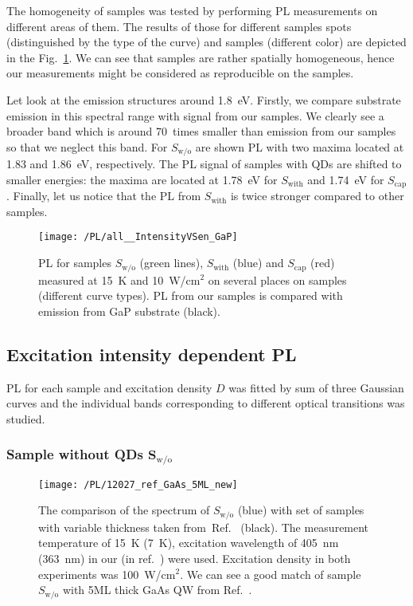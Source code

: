 The homogeneity of samples was tested by performing PL measurements on different areas of them. The results of those for different samples spots (distinguished by the type of the curve) and samples (different color) are depicted in the Fig.~\ref{fig:PL_homogenity}. We can see that samples are rather spatially homogeneous, hence our measurements might be considered as reproducible on the samples. %

Let look at the emission structures around 1.8~eV. Firstly, we compare substrate emission in this spectral range with signal from our samples. We clearly see a broader band which is around 70~times smaller than emission from our samples so that we neglect this band. For $S_\mathrm{w/o}$ are shown PL with two maxima located at 1.83 and 1.86~eV, respectively. The PL signal of samples with QDs are shifted to smaller energies: the maxima are located at 1.78~eV for $S_\mathrm{with}$ and 1.74~eV for $S_\mathrm{cap}$. Finally, let us notice that the PL from $S_\mathrm{with}$ is twice stronger compared to other samples.
\begin{figure}
	\centering
	\texttt{[image: /PL/all\_\_IntensityVSen\_GaP]}
	\caption{PL for samples $S_\mathrm{w/o}$ (green lines), $S_\mathrm{with}$ (blue) and $S_\mathrm{cap}$ (red) measured at 15~K and 10~W/cm$^2$ on several places on samples (different curve types). PL from our samples is compared with emission from GaP substrate (black).}
	\label{fig:PL_homogenity}
\end{figure}

\subsection{Excitation intensity dependent PL}
\label{sec:intensity_PL_TU}
PL for each sample and excitation density $D$ was fitted by sum of three Gaussian curves and the individual bands corresponding to different optical transitions was studied. 

\subsubsection*{Sample without QDs $\mathbf{S_\mathrm{w/o}}$}

\begin{figure}
	\centering
	\texttt{[image: /PL/12027\_ref\_GaAs\_5ML\_new]}
	\caption{The comparison of the spectrum of $S_\mathrm{w/o}$ (blue) with set of samples with variable thickness taken from~Ref.~\citep{Prieto_APL1997} (black). The measurement temperature of 15~K (7~K), excitation wavelength of 405~nm (363~nm) in our (in ref.~\citep{Prieto_APL1997}) were used. Excitation density in both experiments was 100~W/cm$^2$. We can see a good match of sample $S_\mathrm{w/o}$ with 5ML thick GaAs QW from Ref.~\citep{Prieto_APL1997}.}
	\label{fig:12027_ref}
\end{figure}


